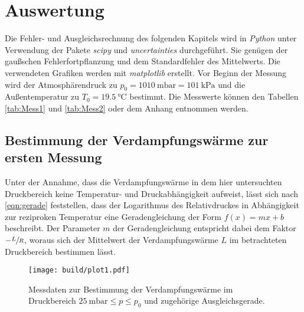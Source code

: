 \section{Auswertung}
\label{sec:Auswertung}
Die Fehler- und Ausgleichsrechnung des folgenden Kapitels wird in \textit{Python} unter Verwendung der Pakete \textit{scipy} \cite{scipy} und \textit{uncertainties}
\cite{uncertainties} durchgeführt. Sie genügen der gaußschen Fehlerfortpflanzung und dem Standardfehler des Mittelwerts. 
Die verwendeten Grafiken werden mit \textit{matplotlib} \cite{matplotlib} erstellt.
Vor Beginn der Messung wird der Atmosphärendruck zu $p_0 = \qty{1010}{\milli\bar} = \qty{101}{\kilo\pascal}$ und die Außentemperatur zu 
$T_0 = \qty{19.5}{\degreeCelsius}$ bestimmt.
Die Messwerte können den Tabellen \ref{tab:Mess1} und \ref{tab:Mess2} oder dem Anhang entnommen werden.

\subsection{Bestimmung der Verdampfungswärme zur ersten Messung}
\label{subsec:A_L_Bestimmung}
Unter der Annahme, dass die Verdampfungswärme in dem hier untersuchten Druckbereich keine Temperatur- und Druckabhängigkeit aufweist, lässt sich nach \autoref{eqn:gerade}
feststellen, dass der Logarithmus des Relativdruckes in Abhängigkeit zur reziproken Temperatur eine Geradengleichung der Form $f(x) = mx + b$ beschreibt. 
Der Parameter $m$ der Geradengleichung entspricht dabei dem Faktor $-\sfrac{L}{R}$, woraus sich der Mittelwert der Verdampfungswärme $L$ im betrachteten Druckbereich bestimmen lässt.

\begin{figure}
    \centering
    \texttt{[image: build/plot1.pdf]}
    \caption{Messdaten zur Bestimmung der Verdampfungswärme im Druckbereich $\qty{25}{\milli\bar} \leq p \leq p_0$ und zugehörige Ausgleichsgerade.}
    \label{fig:plot1}
\end{figure}

